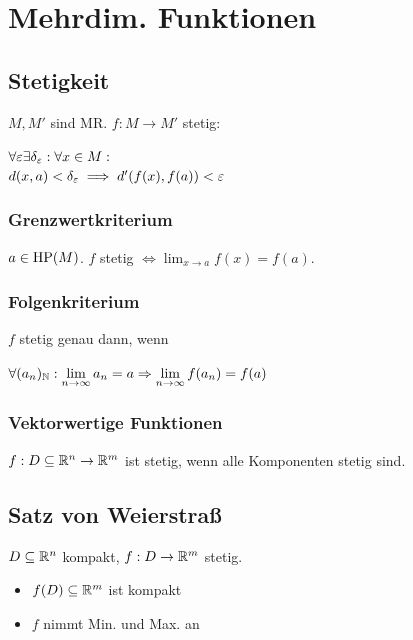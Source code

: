 \section*{Mehrdim. Funktionen}

\subsection*{Stetigkeit}
$M,M'$ sind MR. $f: M \to M'$ stetig:

$\forall \varepsilon \exists \delta_\varepsilon:\forall x \in M: $ \\ $d(x,a) < \delta_\varepsilon \implies d'(f(x), f(a)) < \varepsilon$

\subsubsection*{Grenzwertkriterium}
$a \in \operatorname{HP}(M)$. $f$ stetig $\displaystyle \Leftrightarrow \lim_{x\to a}f(x)=f(a)$.

\subsubsection*{Folgenkriterium}
$f$ stetig genau dann, wenn

$\displaystyle \forall (a_n)_{\mathbb{N}}: \lim_{n\to\infty}a_n=a \Rightarrow \lim_{n\to\infty}f(a_n)=f(a)$

\subsubsection*{Vektorwertige Funktionen}
$f:D\subseteq\mathbb{R}^n \to \mathbb{R}^m$ ist stetig, wenn alle Komponenten stetig sind.

\subsection*{Satz von Weierstraß}
$D \subseteq \mathbb{R}^n$ kompakt, $f:D\to\mathbb{R}^m$ stetig.
\begin{itemize}
	\item $f(D) \subseteq \mathbb{R}^m$ ist kompakt
	\item $f$ nimmt Min. und Max. an
\end{itemize}
